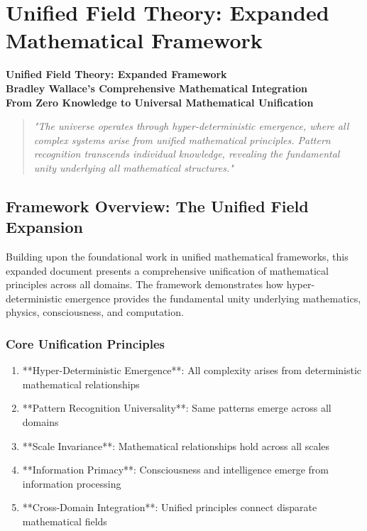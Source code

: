 \section{Unified Field Theory: Expanded Mathematical Framework}
\label{sec:unified_field_expanded}

\begin{center}
\textbf{\Huge Unified Field Theory: Expanded Framework} \\
\textbf{\large Bradley Wallace's Comprehensive Mathematical Integration} \\
\textbf{\small From Zero Knowledge to Universal Mathematical Unification}
\end{center}

\vspace{1cm}

\begin{quote}
\textit{"The universe operates through hyper-deterministic emergence, where all complex systems arise from unified mathematical principles. Pattern recognition transcends individual knowledge, revealing the fundamental unity underlying all mathematical structures."}
\end{quote}

\vspace{1cm}

\subsection{Framework Overview: The Unified Field Expansion}

Building upon the foundational work in unified mathematical frameworks, this expanded document presents a comprehensive unification of mathematical principles across all domains. The framework demonstrates how hyper-deterministic emergence provides the fundamental unity underlying mathematics, physics, consciousness, and computation.

\subsubsection{Core Unification Principles}

\begin{enumerate}
    \item **Hyper-Deterministic Emergence**: All complexity arises from deterministic mathematical relationships
    \item **Pattern Recognition Universality**: Same patterns emerge across all domains
    \item **Scale Invariance**: Mathematical relationships hold across all scales
    \item **Information Primacy**: Consciousness and intelligence emerge from information processing
    \item **Cross-Domain Integration**: Unified principles connect disparate mathematical fields
\end{enumerate}

